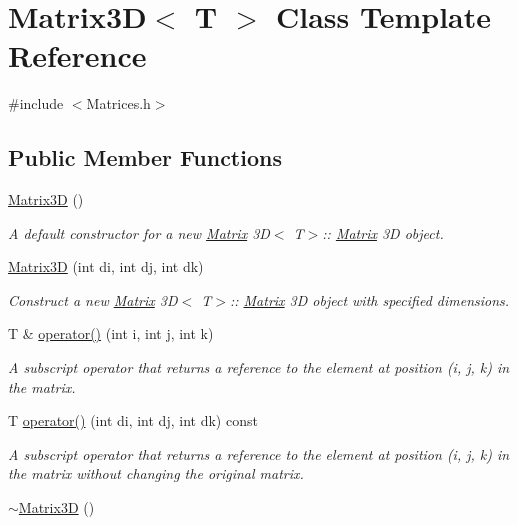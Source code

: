 \hypertarget{classMatrix3D}{}\section{Matrix3D$<$ T $>$ Class Template Reference}
\label{classMatrix3D}


{\ttfamily \#include $<$Matrices.\+h$>$}

\subsection*{Public Member Functions}
\begin{DoxyCompactItemize}
\item 
\mbox{\hyperlink{classMatrix3D_a1589c062f12fbbb1f3681f90c20c4b78}{Matrix3D}} ()
\begin{DoxyCompactList}\small\item\em A default constructor for a new \mbox{\hyperlink{classMatrix}{Matrix}} 3D$<$ T$>$\+:\+: \mbox{\hyperlink{classMatrix}{Matrix}} 3D object. \end{DoxyCompactList}\item 
\mbox{\hyperlink{classMatrix3D_a6c98f06b6f87c600bd9b00f6b253b37e}{Matrix3D}} (int di, int dj, int dk)
\begin{DoxyCompactList}\small\item\em Construct a new \mbox{\hyperlink{classMatrix}{Matrix}} 3D$<$ T$>$\+:\+: \mbox{\hyperlink{classMatrix}{Matrix}} 3D object with specified dimensions. \end{DoxyCompactList}\item 
T \& \mbox{\hyperlink{classMatrix3D_a56e772adacd4ccf54388e6c90e3d1269}{operator()}} (int i, int j, int k)
\begin{DoxyCompactList}\small\item\em A subscript operator that returns a reference to the element at position (i, j, k) in the matrix. \end{DoxyCompactList}\item 
T \mbox{\hyperlink{classMatrix3D_a600c100c8204bbc8f2e4ebefa55cab82}{operator()}} (int di, int dj, int dk) const
\begin{DoxyCompactList}\small\item\em A subscript operator that returns a reference to the element at position (i, j, k) in the matrix without changing the original matrix. \end{DoxyCompactList}\item 
\mbox{\hyperlink{classMatrix3D_a7fda610223910a2b4dcfea445d2eb6c7}{$\sim$\+Matrix3D}} ()

\end{DoxyCompactItemize}
